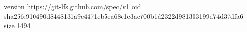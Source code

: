 version https://git-lfs.github.com/spec/v1
oid sha256:910490d8448131a9c4471eb5ea68e1e3ac700b1d2322d981303199d74d37dfa6
size 1494
